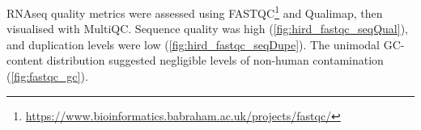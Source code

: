 
\gls{RNAseq} quality metrics were assessed using FASTQC\footnote{\url{https://www.bioinformatics.babraham.ac.uk/projects/fastqc/}} and Qualimap\autocite{okonechnikov2015QualimapAdvancedMultisample}, then visualised with MultiQC\autocite{ewels2016MultiQCSummarizeAnalysis}.
Sequence quality was high (\cref{fig:hird_fastqc_seqQual}), and duplication levels were low (\cref{fig:hird_fastqc_seqDupe}).
The unimodal GC-content distribution suggested negligible levels of non-human contamination (\cref{fig:fastqc_gc}).

